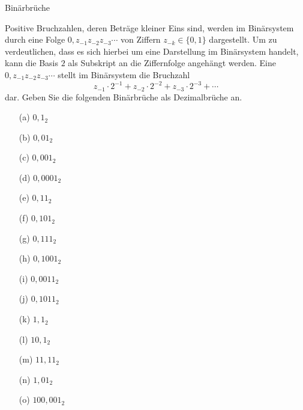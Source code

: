 \begin{exercise}{Binärbrüche}

\begin{body}Positive Bruchzahlen, deren Beträge kleiner Eins sind, werden im Binärsystem durch eine Folge ${0{,}z_{-1}z_{-2}z_{-3}\dotsb}$ von Ziffern $z_{-k} \in \{0,1\}$ dargestellt. Um zu verdeutlichen, dass es sich hierbei um eine Darstellung im Binärsystem handelt, kann die Basis $2$ als Subskript an die Ziffernfolge angehängt werden. Eine ${0{,}z_{-1}z_{-2}z_{-3}\dotsb}$ stellt im Binärsystem die Bruchzahl
\[ z_{-1}\cdot 2^{-1} + z_{-2}\cdot 2^{-2} + z_{-3}\cdot 2^{-3} + \dotsb  \] 
dar. Geben Sie die folgenden Binärbrüche als Dezimalbrüche an.
\begin{center}
\begin{minipage}{0.3\textwidth}
\begin{itemize}
\item[(a)] $0{,}1_2$
\item[(b)] $0{,}01_2$
\item[(c)] $0{,}001_2$
\item[(d)] $0{,}0001_2$
\item[(e)] $0{,}11_2$
\end{itemize}
\end{minipage}
\begin{minipage}{0.3\textwidth}
\begin{itemize}
\item[(f)] $0{,}101_2$
\item[(g)] $0{,}111_2$
\item[(h)] $0{,}1001_2$
\item[(i)] $0{,}0011_2$
\item[(j)] $0{,}1011_2$
\end{itemize}
\end{minipage}
\begin{minipage}{0.3\textwidth}
\begin{itemize}
\item[(k)] $1{,}1_2$
\item[(l)] $10{,}1_2$
\item[(m)] $11{,}11_2$
\item[(n)] $1{,}01_2$
\item[(o)] $100{,}001_2$
\end{itemize}
\end{minipage}
\end{center}
\end{body}

\begin{solution}


\end{solution}
\end{exercise}
